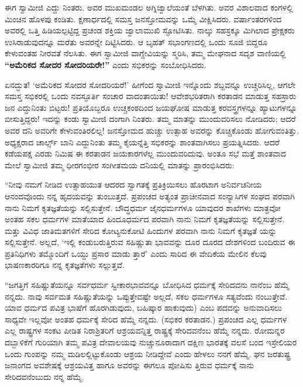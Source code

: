 ಈಗ ಸ್ವಾಮೀಜಿ ಎದ್ದು ನಿಂತರು. ಅವರ ಮುಖಮಂಡಲ ಅಗ್ನಿಜ್ವಾಲೆಯಂತೆ ಬೆಳಗಿತು. ಅವರ ವಿಶಾಲವಾದ ಕಂಗಳಲ್ಲಿ ಮಿಂಚಿನ ಹೊಳಪು ಕಂಡಿತು. ಕ್ಷಣಾರ್ಧದಲ್ಲಿ ಸಮಸ್ತ ಜನಸ್ತೋಮವನ್ನು ಒಮ್ಮೆ ವೀಕ್ಷಿಸಿದರು. ವರ್ಷಾಂತರಗಳಿಂದ ಅವರಲ್ಲಿ ಒತ್ತಿ ಹಿಡಿಯಲ್ಪಟ್ಟಿದ್ದ ಪ್ರಚಂಡ ಶಕ್ತಿಯ ಜ್ವಾಲಾಮುಖಿ ಸ್ಫೋಟಿಸಿತು. ನಾಲ್ಕು ಸಹಸ್ರಕ್ಕೂ ಮಿಗಿಲಾದ ಪ್ರೇಕ್ಷಕರು ಉಸಿರಾಡುವುದನ್ನೂ ಮರೆತು ಅವರನ್ನೇ ದಿಟ್ಟಿಸಿದರು. ಆ ಬೃಹತ್ ಸಭಾಂಗಣದಲ್ಲಿ ಒಂದು ಸೂಜಿ ಬಿದ್ದರೂ ಕೇಳುವಂತಹ ನೀರವತೆ ನೆಲಸಿತು. ಈಗ ಸ್ವಾಮೀಜಿ ವಾಗ್ದೇವಿಯನ್ನು ಸ್ಮರಿಸಿ, ತಮ್ಮ ಮೇಘನಾದ ಸದೃಶ ವಾಣಿಯಲ್ಲಿ \textbf{“ಅಮೆರಿಕದ ಸೋದರ ಸೋದರಿಯರೇ!”} ಎಂದು ಸಭಿಕರನ್ನು ಸಂಬೋಧಿಸಿದರು.

ಏನದ್ಭುತ! ‘ಅಮೆರಿಕದ ಸೋದರ ಸೋದರಿಯರೆ!’ ಹೀಗೆಂದ ಸ್ವಾಮೀಜಿ ಇನ್ನೊಂದು ಶಬ್ದವನ್ನೂ ಉಚ್ಚರಿಸಿಲ್ಲ, ಆಗಲೇ ಸಮಸ್ತ ಸಭಿಕರಲ್ಲಿ ಒಂದು ನವಸ್ಫೂರ್ತಿ ಸಂಚಾರ ವಾದಂತಾಯಿತು! ಆವೇಶಭರಿತರಾಗಿ ಕರತಾಡನ ಮಾಡುತ್ತ ಸಹಸ್ರಾರು ಜನ ಎದ್ದುನಿಂತು ಬಿಟ್ಟರು! ಪ್ರತಿಯೊಬ್ಬರೂ ಉಚ್ಚಕಂಠದಿಂದ ಜಯಘೋಷ ಮಾಡುತ್ತ ಕರವಸ್ತ್ರಗಳನ್ನೂ ಹ್ಯಾಟುಗಳನ್ನೂ ಬೀಸುತ್ತಿದ್ದರು! ಇದನ್ನು ಕಂಡು ಸ್ವಾಮೀಜಿ ದಂಗಾಗಿ ನಿಂತರು. ತಮ್ಮ ಮಾತನ್ನು ಮುಂದುವರಿಸಲು ನೋಡಿದರು; ಆದರೆ ಅವರ ದನಿ ಅವರಿಗೇ ಕೇಳುವಂತಿರಲಿಲ್ಲ! ಜನಸ್ತೋಮದ ಹುಚ್ಚು ಉತ್ಸಾಹ ಅವರನ್ನು ಕೊಚ್ಚಿಕೊಂಡು ಹೋಗುವಂತಿತ್ತು. ಅಧ್ಯಕ್ಷರಾದ ಚಾರ್ಲ್ಸ್ ಬಾನಿ ಎದ್ದುನಿಂತು ತಮ್ಮ ಕೈಯನ್ನೆತ್ತಿ ಸಭಿಕರನ್ನು ಶಾಂತವಾಗಿಸಲು ಪ್ರಯತ್ನಿಸಿದರು. ಆದರೆ ಕಡೆಯಪಕ್ಷ ಎರಡು ನಿಮಿಷ ಈ ಕರತಾಡನ ಜಯಕಾರಗಳೆಲ್ಲ ಮುಂದುವರಿದುವು. ಅಂತೂ ಸಭೆ ಮತ್ತೆ ಶಾಂತವಾದ ಮೇಲೆ ಸ್ವಾಮೀಜಿ ತಮ್ಮ ಧೀರಗಂಭೀರ ಸಂಗೀತಮಯ ದನಿಯಲ್ಲಿ ಮಾತನ್ನು ಪ್ರಾರಂಭಿಸಿದರು:

“ನೀವು ನಮಗೆ ನೀಡಿದ ಉತ್ಸಾಹಯುತ ಆದರದ ಸ್ವಾಗತಕ್ಕೆ ಪ್ರತಿಕ್ರಿಯಿಸಲು ಹೊರಟಾಗ ಅನಿರ್ವಚನೀಯ ಆನಂದವೊಂದು ನನ್ನ ಹೃದಯವನ್ನು ತುಂಬುತ್ತದೆ. ಪ್ರಪಂಚದ ಅತ್ಯಂತ ಪ್ರಾಚೀನವಾದ ಸಂನ್ಯಾಸಿಗಳ ಸಂಘದ ಪರವಾಗಿ ನಾನು ನಿಮಗೆ ಕೃತಜ್ಞತೆಯನ್ನು ಸಲ್ಲಿಸುತ್ತೇನೆ. ಬೌದ್ಧಧರ್ಮ ಜೈನಧರ್ಮಗಳೂ ಯಾವುದರ ಶಾಖೆಗಳು ಮಾತ್ರವೋ ಅಂತಹ ಸಕಲ ಧರ್ಮಗಳ ಮಾತೆಯಾದ ಹಿಂದೂಧರ್ಮದ ಪರವಾಗಿ ನಾನು ನಿಮಗೆ ಕೃತಜ್ಞತೆಯನ್ನು ಸಲ್ಲಿಸುತ್ತೇನೆ. ಮತ್ತು ವಿವಿಧ ಜಾತಿಮತಗಳಿಗೆ ಸೇರಿದ ಕೋಟ್ಯನುಕೋಟಿ ಹಿಂದುಗಳ ಪರವಾಗಿ ನಾನು ನಿಮಗೆ ಕೃತಜ್ಞತೆ ಯನ್ನು ಸಲ್ಲಿಸುತ್ತೇನೆ. ಅಲ್ಲದೆ, ‘ಇಲ್ಲಿ ಕಂಡುಬರುತ್ತಿರುವ ಸಹಿಷ್ಣುತಾ ಭಾವವನ್ನು ದೂರ ದೂರದ ದೇಶಗಳಿಂದ ಬಂದಿರುವ ಈ ಪ್ರತಿನಿಧಿಗಳು ತಮ್ಮೊಂದಿಗೆ ಒಯ್ದು ಪ್ರಸಾರ ಮಾಡು ತ್ತಾರೆ’ ಎಂದು ಸಾರಿದ ಈ ವೇದಿಕೆಯ ಮೇಲಿನ ಕೆಲವು ಭಾಷಣಕಾರರಿಗೂ ನನ್ನ ಕೃತಜ್ಞತೆಗಳು ಸಲ್ಲುತ್ತವೆ.

“ಜಗತ್ತಿಗೆ ಸಹಿಷ್ಣುತೆಯನ್ನೂ ಸರ್ವಧರ್ಮ ಸ್ವೀಕಾರಭಾವವನ್ನೂ ಬೋಧಿಸಿದ ಧರ್ಮಕ್ಕೆ ಸೇರಿದವನು ನಾನೆಂಬ ಹೆಮ್ಮೆ ನನ್ನದು. ನಾವು ಸರ್ವಮತ ಸಹಿಷ್ಣುತೆಯನ್ನು ಒಪ್ಪುತ್ತೇವಷ್ಟೇ ಅಲ್ಲದೆ, ಸಕಲ ಧರ್ಮಗಳೂ ಸತ್ಯವೆಂದು ನಂಬುತ್ತೇವೆ. ಯಾವ ಧರ್ಮದ ಪವಿತ್ರ ಭಾಷೆಗೆ ಹೊರಗಿಡುವುದು, ಬಹಿಷ್ಕಾರ ಹಾಕುವುದು) ಎಂಬ ಪದವನ್ನು ಅನುವಾದಿಸಲು ಸಾಧ್ಯವೇ ಇಲ್ಲವೋ ಅಂತಹ ಧರ್ಮಕ್ಕೆ ಸೇರಿದ ಹೆಮ್ಮೆ ನನ್ನದು. (ಸಭಿಕರ ಕರತಾಡನ.) ಪ್ರಪಂಚದ ಎಲ್ಲ ಧರ್ಮಗಳ ಎಲ್ಲ ರಾಷ್ಟ್ರಗಳ ಸಂಕಟ ಪೀಡಿತ ನಿರಾಶ್ರಿತರಿಗೆ ಆಶ್ರಯವನ್ನಿತ್ತ ರಾಷ್ಟ್ರಕ್ಕೆ ಸೇರಿದವನೆಂಬ ಹೆಮ್ಮೆ ನನ್ನದು. ರೋಮನ್ನರ ದಬ್ಬಾಳಿಕೆಗೆ ಗುರಿಯಾಗಿ ತಮ್ಮ ಪವಿತ್ರ ದೇವಾಲಯವು ನುಚ್ಚುನೂರಾದಾಗ ದಕ್ಷಿಣ ಭಾರತಕ್ಕೆ ವಲಸೆ ಬಂದ ಇಸ್ರೇಲಿಯರ ಒಂದು ಗುಂಪನ್ನು ನಮ್ಮ ಮಡಿಲಲ್ಲಿಟ್ಟುಕೊಂಡು ಆಶ್ರಯ ನೀಡಿದ್ದೇವೆ ಎಂದು ಹೇಳಲು ನನಗೆ ಹೆಮ್ಮೆ. ಘನ ಜರತುಷ್ಟ್ರ ಜನಾಂಗದ ಅವಶೇಷಕ್ಕೆ ಆಶ್ರಯವಿತ್ತ ಹಾಗೂ ಅವರನ್ನು ಈಗಲೂ ಪೋಷಿಸು ತ್ತಿರುವ ಧರ್ಮಕ್ಕೆ ನಾನು ಸೇರಿದವನೆಂಬುದು ನನ್ನ ಹೆಮ್ಮೆ.

